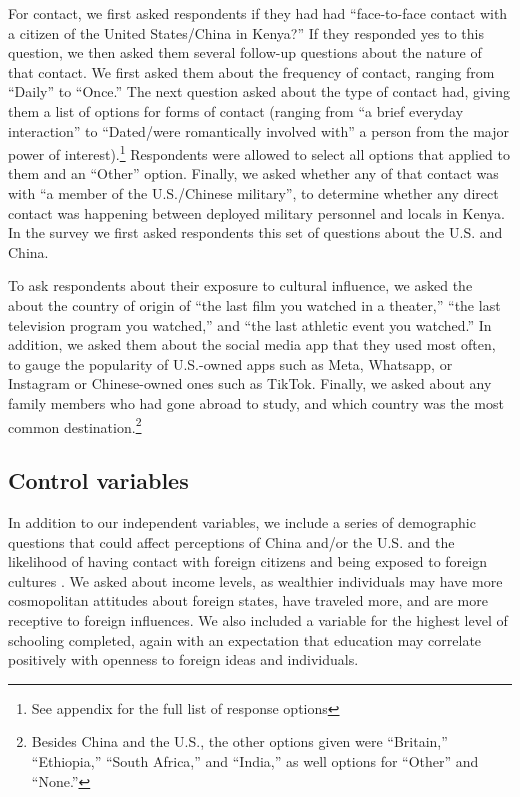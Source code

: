 For contact, we first asked respondents if they had had ``face-to-face contact with a citizen of the United States/China in Kenya?'' If they responded yes to this question, we then asked them several follow-up questions about the nature of that contact. We first asked them about the frequency of contact, ranging from ``Daily'' to ``Once.'' The next question asked about the type of contact had, giving them a list of options for forms of contact (ranging from ``a brief everyday interaction'' to ``Dated/were romantically involved with'' a person from the major power of interest).\footnote{See appendix for the full list of response options} Respondents were allowed to select all options that applied to them and an ``Other'' option. Finally, we asked whether any of that contact was with ``a member of the U.S./Chinese military'', to determine whether any direct contact was happening between deployed military personnel and locals in Kenya. In the survey we first asked respondents this set of questions about the U.S. and China.

To ask respondents about their exposure to cultural influence, we asked the about the country of origin of ``the last film you watched in a theater,'' ``the last television program you watched,'' and ``the last athletic event you watched.'' In addition, we asked them about the social media app that they used most often, to gauge the popularity of U.S.-owned apps such as Meta, Whatsapp, or Instagram or Chinese-owned ones such as TikTok. Finally, we asked about any family members who had gone abroad to study, and which country was the most common destination.\footnote{Besides China and the U.S., the other options given were ``Britain,'' ``Ethiopia,'' ``South Africa,'' and ``India,'' as well options for ``Other'' and ``None.''}



\subsection*{Control variables} 

In addition to our independent variables, we include a series of demographic questions that could affect perceptions of China and/or the U.S. and the likelihood of having contact with foreign citizens and being exposed to foreign cultures \cite{clarke2005}. We asked about income levels, as wealthier individuals may have more cosmopolitan attitudes about foreign states, have traveled more, and are more receptive to foreign influences. We also included a variable for the highest level of schooling completed, again with an expectation that education may correlate positively with openness to foreign ideas and individuals.

